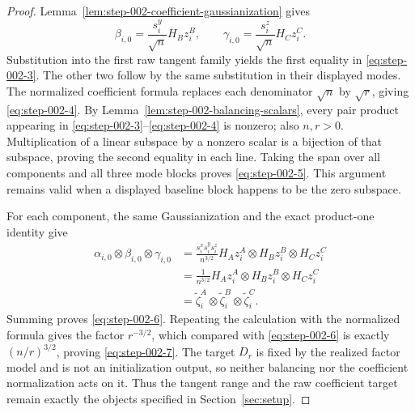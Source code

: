 \begin{proof}
Lemma~\ref{lem:step-002-coefficient-gaussianization}
gives
\[
  \beta_{i,0}=\frac{s_i^y}{\sqrt n}H_Bz_i^B,
  \qquad
  \gamma_{i,0}=\frac{s_i^z}{\sqrt n}H_Cz_i^C.
\]
Substitution into the first raw tangent family yields the first equality in
\eqref{eq:step-002-3}. The other two follow by the same substitution in their displayed modes.
The normalized coefficient formula replaces each denominator \(\sqrt n\) by
\(\sqrt r\), giving \eqref{eq:step-002-4}. By
Lemma~\ref{lem:step-002-balancing-scalars}, every pair product appearing in
\eqref{eq:step-002-3}--\eqref{eq:step-002-4} is nonzero; also \(n,r>0\). Multiplication of a linear subspace by a
nonzero scalar is a bijection of that subspace, proving the second equality in
each line. Taking the span over all components and all three mode blocks proves
\eqref{eq:step-002-5}. This argument remains valid when a displayed baseline block happens to
be the zero subspace.

For each component, the same Gaussianization and the exact product-one identity
give
\[
  \begin{aligned}
  \alpha_{i,0}\otimes\beta_{i,0}\otimes\gamma_{i,0}
  &=\frac{s_i^xs_i^ys_i^z}{n^{3/2}}
      H_Az_i^A\otimes H_Bz_i^B\otimes H_Cz_i^C\\
  &=\frac1{n^{3/2}}
      H_Az_i^A\otimes H_Bz_i^B\otimes H_Cz_i^C\\
  &=\widetilde\zeta_i^A\otimes
    \widetilde\zeta_i^B\otimes
    \widetilde\zeta_i^C.
  \end{aligned}
\]
Summing proves \eqref{eq:step-002-6}. Repeating the calculation with the normalized formula
gives the factor \(r^{-3/2}\), which compared with \eqref{eq:step-002-6} is exactly
\((n/r)^{3/2}\), proving \eqref{eq:step-002-7}. The target \(D_r\) is fixed by the realized
factor model and is not an initialization output, so neither balancing nor the
coefficient normalization acts on it. Thus the tangent range and the raw
coefficient target remain exactly the objects specified in Section~\ref{sec:setup}.


\end{proof}

